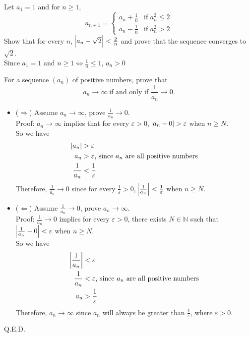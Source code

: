 \documentclass[]{exam}
\begin{document}
\begin{questions}
\question Let $a_1 = 1$ and for $n \geq 1$, 
	\begin{equation*}
		a_{n + 1} =  
			\begin{cases}
			a_n + \frac{1}{n}  & \text{if } a_n ^ 2 \leq 2\\
			a_n - \frac{1}{n}  & \text{if } a_n ^ 2 > 2
			\end{cases}
	\end{equation*}
	Show that for every $n$, $\abs{a_n - \sqrt{2}} < \frac{2}{n}$ and prove that the sequence converges to $\sqrt{2}$. 
	\\ Since $a_1 = 1$ and $n \geq 1 \iff \frac{1}{n} \leq 1$, $a_n > 0$
	

\question For a sequence $(a_n)$ of positive numbers, prove that 
	\begin{equation*}
		a_n \to \infty\ \text{if and only if } \frac{1}{a_n} \to 0.
	\end{equation*}
	\begin{itemize}
		\item ($\Rightarrow$) Assume $a_n \to \infty$, prove $\frac{1}{a_n} \to 0$.
		\\ Proof: $a_n \to \infty$ implies that for every $\varepsilon > 0$, $\abs{a_n - 0} > \varepsilon$ when $n \geq N$.
		\\ So we have 
		\begin{align*}
			\abs{a_n} &> \varepsilon\\
			a_n &> \varepsilon \text{, since $a_n$ are all positive numbers}\\
			\frac{1}{a_n} &< \frac{1}{\varepsilon}
		\end{align*}
		Therefore, $\frac{1}{a_n} \to 0$ since for every $\frac{1}{\varepsilon} > 0$, $\abs{\frac{1}{a_n}} < \frac{1}{\varepsilon}$ when $n \geq N$.
		\item ($\Leftarrow$) Assume $\frac{1}{a_n} \to 0$, prove $a_n \to \infty$.
		\\ Proof: $\frac{1}{a_n} \to 0$ implies for every $\varepsilon > 0$, there exists $N\in \mathbb{N}$ such that $\abs{\frac{1}{a_n} - 0} < \varepsilon$ when $n \geq N$. 
		\\ So we have
		\begin{align*}
			\abs{\frac{1}{a_n}} &< \varepsilon\\
			\frac{1}{a_n} &< \varepsilon \text{, since $a_n$ are all positive numbers}\\
			a_n &> \frac{1}{\varepsilon}
		\end{align*}
		Therefore, $a_n \to \infty$ since $a_n$ will always be greater than $\frac{1}{\varepsilon}$, where $\varepsilon > 0$.
	\end{itemize}
	Q.E.D.
\end{questions}
\end{document}
